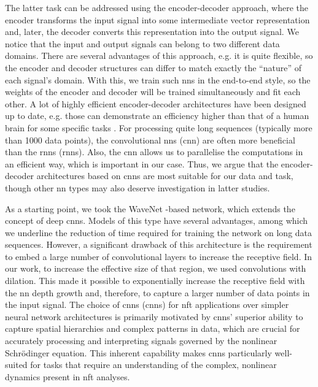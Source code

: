 The latter task can be addressed using the encoder-decoder approach, where the encoder transforms the input signal into some intermediate vector representation and, later, the decoder converts this representation into the output signal. We notice that the input and output signals can belong to two different data domains. There are several advantages of this approach, e.g. it is quite flexible, so the encoder and decoder structures can differ to match exactly the ``nature'' of each signal's domain. With this, we train such \acrshort{nn}s in the end-to-end style, so the weights of the encoder and decoder will be trained simultaneously and fit each other.
A lot of highly efficient encoder-decoder architectures have been designed up to date, e.g. those can demonstrate an efficiency higher than that of a human brain for some specific tasks \cite{ty2014deepface}. For processing quite long sequences (typically more than 1000 data points), the convolutional \acrshort{nn}s (\acrshort{cnn}) are often more beneficial than the \acrlong{rnn}s (\acrshort{rnn}s). Also, the \acrshort{cnn} allows us to parallelise the computations in an efficient way, which is important in our case. Thus, we argue that the encoder-decoder architectures based on \acrshort{cnn}s are most suitable for our data and task, though other \acrshort{nn} types may also deserve investigation in latter studies.


As a starting point, we took the WaveNet \cite{od2016wavenet}-based network, which extends the concept of deep \acrshort{cnn}s. 
Models of this type have several advantages, among which we underline the reduction of time required for training the network on long data sequences. 
However, a significant drawback of this architecture is the requirement to embed a large number of convolutional layers to increase the receptive field. In our work, to increase the effective size of that region, we used convolutions with dilation. This made it possible to exponentially increase the receptive field with the \acrshort{nn} depth growth and, therefore, to capture a larger number of data points in the input signal. The choice of \acrlong{cnn}s (\acrshort{cnn}s) for \acrfull{nft} applications over simpler neural network architectures is primarily motivated by \acrshort{cnn}s' superior ability to capture spatial hierarchies and complex patterns in data, which are crucial for accurately processing and interpreting signals governed by the nonlinear Schrödinger equation. This inherent capability makes \acrshort{cnn}s particularly well-suited for tasks that require an understanding of the complex, nonlinear dynamics present in \acrshort{nft} analyses.


